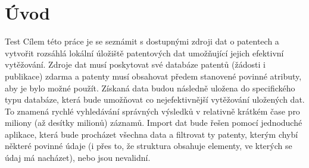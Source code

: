 \chapter{Úvod}
Test 
\newline
\indent Cílem této práce je se seznámit s dostupnými zdroji dat o patentech a vytvořit rozsáhlá lokální úložiště patentových dat umožňující jejich efektivní vytěžování. Zdroje dat musí poskytovat své databáze patentů (žádosti i publikace) zdarma a patenty musí obsahovat předem stanovené povinné atributy, aby je bylo možné použít. Získaná data budou následně uložena do specifického typu databáze, která bude umožňovat co nejefektivnější vytěžování uložených dat. To znamená rychlé vyhledávání správných výsledků v relativně krátkém čase pro miliony (až desítky milionů) záznamů. Import dat bude řešen pomocí jednoduché aplikace, která bude procházet všechna data a filtrovat ty patenty, kterým chybí některé povinné údaje (i přes to, že struktura obsahuje elementy, ve kterých se údaj má nacházet), nebo jsou nevalidní. 

